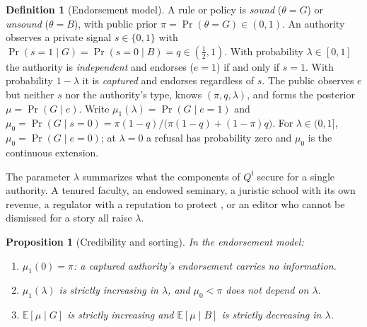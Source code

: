 \documentclass[11pt,letterpaper]{article}
\newtheorem{proposition}[theorem]{Proposition}
\theoremstyle{definition}
\newtheorem{definition}[theorem]{Definition}
\theoremstyle{remark}
\newcommand{\pI}{\mathsf{I}}
\newcommand{\E}{\mathbb{E}}
\newcommand{\Prob}{\Pr}
\begin{document}
\begin{definition}[Endorsement model]
\label{def:ideological-power:endorsement}
A rule or policy is \emph{sound} ($\theta=G$) or \emph{unsound} ($\theta=B$), with public prior $\pi=\Prob(\theta=G)\in(0,1)$. An authority observes a private signal $s\in\{0,1\}$ with $\Prob(s=1\mid G)=\Prob(s=0\mid B)=q\in(\tfrac12,1)$. With probability $\lambda\in[0,1]$ the authority is \emph{independent} and endorses ($e=1$) if and only if $s=1$. With probability $1-\lambda$ it is \emph{captured} and endorses regardless of $s$. The public observes $e$ but neither $s$ nor the authority's type, knows $(\pi,q,\lambda)$, and forms the posterior $\mu=\Prob(G\mid e)$. Write $\mu_1(\lambda)=\Prob(G\mid e=1)$ and $\mu_0=\Prob(G\mid s=0)=\pi(1-q)/\bigl(\pi(1-q)+(1-\pi)q\bigr)$. For $\lambda\in(0,1]$, $\mu_0=\Prob(G\mid e=0)$; at $\lambda=0$ a refusal has probability zero and $\mu_0$ is the continuous extension.
\end{definition}

The parameter $\lambda$ summarizes what the components of $Q^{\pI}$ secure for a single authority. A tenured faculty, an endowed seminary, a juristic school with its own revenue, a regulator with a reputation to protect \citep{carpenter2010}, or an editor who cannot be dismissed for a story all raise $\lambda$.

\begin{proposition}[Credibility and sorting]
\label{prop:ideological-power:credibility}
In the endorsement model:
\begin{enumerate}
\item[(a)] $\mu_1(0)=\pi$: a captured authority's endorsement carries no information.
\item[(b)] $\mu_1(\lambda)$ is strictly increasing in $\lambda$, and $\mu_0<\pi$ does not depend on $\lambda$.
\item[(c)] $\E[\mu\mid G]$ is strictly increasing and $\E[\mu\mid B]$ is strictly decreasing in $\lambda$.
\end{enumerate}
\end{proposition}
\end{document}
